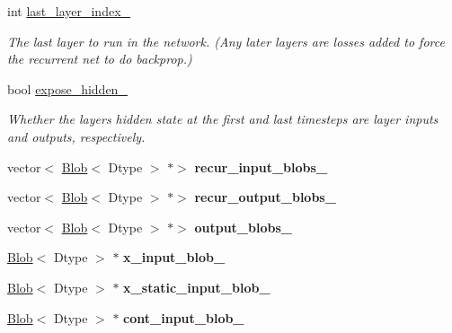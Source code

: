\begin{DoxyCompactItemize}
\mbox{\label{classcaffe_1_1_recurrent_layer_a0a7a7d94ed74d4199b9d7b8445d5aadb}} 
int \mbox{\hyperlink{classcaffe_1_1_recurrent_layer_a0a7a7d94ed74d4199b9d7b8445d5aadb}{last\+\_\+layer\+\_\+index\+\_\+}}
\begin{DoxyCompactList}\small\item\em The last layer to run in the network. (Any later layers are losses added to force the recurrent net to do backprop.) \end{DoxyCompactList}\item 
\mbox{\label{classcaffe_1_1_recurrent_layer_abfafaacb1fece0309e750e0d307fb76e}} 
bool \mbox{\hyperlink{classcaffe_1_1_recurrent_layer_abfafaacb1fece0309e750e0d307fb76e}{expose\+\_\+hidden\+\_\+}}
\begin{DoxyCompactList}\small\item\em Whether the layer\textquotesingle{}s hidden state at the first and last timesteps are layer inputs and outputs, respectively. \end{DoxyCompactList}\item 
\mbox{\label{classcaffe_1_1_recurrent_layer_a7d3778cc65bce4817268fbe9b3b0738f}} 
vector$<$ \mbox{\hyperlink{classcaffe_1_1_blob}{Blob}}$<$ Dtype $>$ $\ast$$>$ {\bfseries recur\+\_\+input\+\_\+blobs\+\_\+}
\item 
\mbox{\label{classcaffe_1_1_recurrent_layer_ac7d6de4a87f3b3fdaecc8a28f038b15d}} 
vector$<$ \mbox{\hyperlink{classcaffe_1_1_blob}{Blob}}$<$ Dtype $>$ $\ast$$>$ {\bfseries recur\+\_\+output\+\_\+blobs\+\_\+}
\item 
\mbox{\label{classcaffe_1_1_recurrent_layer_a91612f30f7425d584603ba896c742287}} 
vector$<$ \mbox{\hyperlink{classcaffe_1_1_blob}{Blob}}$<$ Dtype $>$ $\ast$$>$ {\bfseries output\+\_\+blobs\+\_\+}
\item 
\mbox{\label{classcaffe_1_1_recurrent_layer_afe9594bd3feeed60c3cfa6f0f5a44e79}} 
\mbox{\hyperlink{classcaffe_1_1_blob}{Blob}}$<$ Dtype $>$ $\ast$ {\bfseries x\+\_\+input\+\_\+blob\+\_\+}
\item 
\mbox{\label{classcaffe_1_1_recurrent_layer_a3506d1843897f8e639106a112ca2ae3d}} 
\mbox{\hyperlink{classcaffe_1_1_blob}{Blob}}$<$ Dtype $>$ $\ast$ {\bfseries x\+\_\+static\+\_\+input\+\_\+blob\+\_\+}
\item 
\mbox{\label{classcaffe_1_1_recurrent_layer_a0d006627af470fedb6f1fc5c66c68390}} 
\mbox{\hyperlink{classcaffe_1_1_blob}{Blob}}$<$ Dtype $>$ $\ast$ {\bfseries cont\+\_\+input\+\_\+blob\+\_\+}
\end{DoxyCompactItemize}


